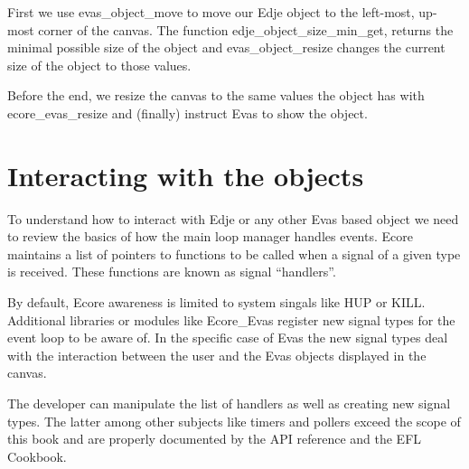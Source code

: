 \documentclass[12pt,a4paper,english]{book}
\begin{document}
First we use evas{\_}object{\_}move to move our Edje object to the left-most, up-most
corner of the canvas. The function edje{\_}object{\_}size{\_}min{\_}get, returns the
minimal possible size of the object and evas{\_}object{\_}resize changes the current
size of the object to those values.

Before the end, we resize the canvas to the same values the object has with
ecore{\_}evas{\_}resize and (finally) instruct Evas to show the object.



\hypertarget{interacting-with-the-objects}{}
\section{Interacting with the objects}

To understand how to interact with Edje or any other Evas based object we need
to review the basics of how the main loop manager handles events. Ecore
maintains a list of pointers to functions to be called when a signal of a given
type is received. These functions are known as signal ``handlers''.

By default, Ecore awareness is limited to system singals like HUP or KILL.
Additional libraries or modules like Ecore{\_}Evas register new signal types for
the event loop to be aware of. In the specific case of Evas the new signal
types deal with the interaction between the user and the Evas objects displayed
in the canvas.

The developer can manipulate the list of handlers as well as creating new
signal types. The latter among other subjects like timers and pollers exceed
the scope of this book and are properly documented by the API reference and the
EFL Cookbook.
\end{document}
